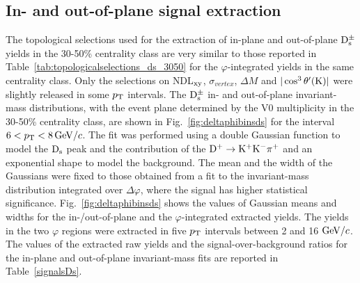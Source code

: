  \subsection{In- and out-of-plane signal extraction}
 \label{sec:SigExtracV2}
 The topological selections used for the extraction of
 in-plane and out-of-plane ${\rm D_s^{\pm}}$ yields in the 30-50\% centrality class
 are very similar to those reported in Table~\ref{tab:topologicalselections_ds_3050} for the
 $\varphi$-integrated yields in the same centrality class.
 Only the selections on NDL$_{\rm xy}$, $\sigma_{vertex}$, $\Delta M$ 
 and $|\cos^3 \theta^\prime({\rm K})|$ were slightly released in some $p_{\rm T}$
 intervals. The ${\rm D_s^{\pm}}$ in- and out-of-plane invariant-mass distributions, 
with the event plane determined by the V0 multiplicity 
in the 30-50\% centrality class, are shown in Fig.~\ref{fig:deltaphibinsds} 
for the interval $6 < p_{\rm T} < 8 \, \mathrm{GeV}/c$.
The fit was performed using a double Gaussian function to model 
the ${\rm D_s}$ peak and the contribution of the ${\rm D^{+}\to K^+ K^-\pi^+}$ and 
an exponential shape to model the background.
The mean and the width of the Gaussians were fixed to those obtained from a fit to
the invariant-mass distribution integrated over $\Delta \varphi$, 
where the signal has higher statistical significance. 
Fig.~\ref{fig:deltaphibinsds} shows the values of Gaussian means and 
widths for the in-/out-of-plane and the $\varphi$-integrated extracted yields.
The yields in the two $\varphi$ regions were extracted in five $p_{\rm T}$ 
intervals between 2 and 16 $\mathrm{GeV}/c$.
The values of the extracted raw yields and the signal-over-background 
ratios for the in-plane and out-of-plane invariant-mass fits 
are reported in Table~\ref{signalsDs}.

